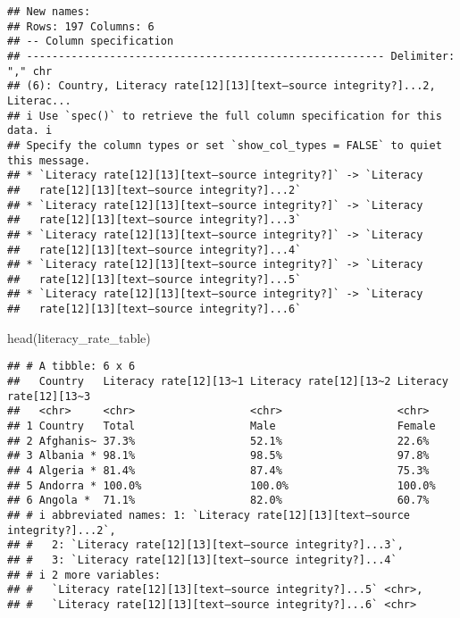 \documentclass[
]{article}
\newenvironment{Shaded}{\begin{snugshade}}{\end{snugshade}}
\newcommand{\FunctionTok}[1]{\textcolor[rgb]{0.00,0.00,0.00}{#1}}
\newcommand{\NormalTok}[1]{#1}
\begin{document}
\begin{verbatim}
## New names:
## Rows: 197 Columns: 6
## -- Column specification
## -------------------------------------------------------- Delimiter: "," chr
## (6): Country, Literacy rate[12][13][text–source integrity?]...2, Literac...
## i Use `spec()` to retrieve the full column specification for this data. i
## Specify the column types or set `show_col_types = FALSE` to quiet this message.
## * `Literacy rate[12][13][text–source integrity?]` -> `Literacy
##   rate[12][13][text–source integrity?]...2`
## * `Literacy rate[12][13][text–source integrity?]` -> `Literacy
##   rate[12][13][text–source integrity?]...3`
## * `Literacy rate[12][13][text–source integrity?]` -> `Literacy
##   rate[12][13][text–source integrity?]...4`
## * `Literacy rate[12][13][text–source integrity?]` -> `Literacy
##   rate[12][13][text–source integrity?]...5`
## * `Literacy rate[12][13][text–source integrity?]` -> `Literacy
##   rate[12][13][text–source integrity?]...6`
\end{verbatim}

\begin{Shaded}
\begin{Highlighting}[]
\FunctionTok{head}\NormalTok{(literacy\_rate\_table)}
\end{Highlighting}
\end{Shaded}

\begin{verbatim}
## # A tibble: 6 x 6
##   Country   Literacy rate[12][13~1 Literacy rate[12][13~2 Literacy rate[12][13~3
##   <chr>     <chr>                  <chr>                  <chr>                 
## 1 Country   Total                  Male                   Female                
## 2 Afghanis~ 37.3%                  52.1%                  22.6%                 
## 3 Albania * 98.1%                  98.5%                  97.8%                 
## 4 Algeria * 81.4%                  87.4%                  75.3%                 
## 5 Andorra * 100.0%                 100.0%                 100.0%                
## 6 Angola *  71.1%                  82.0%                  60.7%                 
## # i abbreviated names: 1: `Literacy rate[12][13][text–source integrity?]...2`,
## #   2: `Literacy rate[12][13][text–source integrity?]...3`,
## #   3: `Literacy rate[12][13][text–source integrity?]...4`
## # i 2 more variables:
## #   `Literacy rate[12][13][text–source integrity?]...5` <chr>,
## #   `Literacy rate[12][13][text–source integrity?]...6` <chr>
\end{verbatim}
\end{document}
